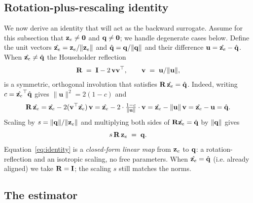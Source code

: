 \subsection{Rotation-plus-rescaling identity}

We now derive an identity that will act as the backward surrogate.
Assume for this subsection that $\mathbf{z}_e \neq \mathbf{0}$ and
$\mathbf{q} \neq \mathbf{0}$; we handle degenerate cases below. Define
the unit vectors $\hat{\mathbf{z}_e} = \mathbf{z}_e/\|\mathbf{z}_e\|$ and
$\hat{\mathbf{q}} = \mathbf{q}/\|\mathbf{q}\|$ and their difference
$\mathbf{u} = \hat{\mathbf{z}_e} - \hat{\mathbf{q}}$. When $\hat{\mathbf{z}_e} \neq
\hat{\mathbf{q}}$ the Householder reflection
\begin{equation}
  \mathbf{R} \;=\; \mathbf{I} - 2\,\mathbf{v}\mathbf{v}^\top,
  \qquad
  \mathbf{v} \;=\; \mathbf{u}/\|\mathbf{u}\|,
  \label{eq:householder}
\end{equation}
is a symmetric, orthogonal involution that satisfies
$\mathbf{R}\,\hat{\mathbf{z}_e} = \hat{\mathbf{q}}$. Indeed, writing
$c = \hat{\mathbf{z}_e}^\top\hat{\mathbf{q}}$ gives $\|\mathbf{u}\|^2 = 2(1 - c)$ and
\begin{equation}
  \mathbf{R}\,\hat{\mathbf{z}_e}
    = \hat{\mathbf{z}_e} - 2(\mathbf{v}^\top\hat{\mathbf{z}_e})\,\mathbf{v}
    = \hat{\mathbf{z}_e} - 2\cdot\tfrac{1-c}{\|\mathbf{u}\|}\cdot\mathbf{v}
    = \hat{\mathbf{z}_e} - \|\mathbf{u}\|\,\mathbf{v}
    = \hat{\mathbf{z}_e} - \mathbf{u}
    = \hat{\mathbf{q}}.
  \label{eq:reflection-check}
\end{equation}
Scaling by $s = \|\mathbf{q}\|/\|\mathbf{z}_e\|$ and multiplying both sides of
$\mathbf{R}\hat{\mathbf{z}_e} = \hat{\mathbf{q}}$ by $\|\mathbf{q}\|$ gives
\begin{equation}
  s\,\mathbf{R}\,\mathbf{z}_e \;=\; \mathbf{q}.
  \label{eq:identity}
\end{equation}
Equation~\eqref{eq:identity} is a \emph{closed-form linear map} from
$\mathbf{z}_e$ to $\mathbf{q}$: a rotation-reflection and an isotropic scaling, no
free parameters. When $\hat{\mathbf{z}_e} = \hat{\mathbf{q}}$ (i.e. already aligned)
we take $\mathbf{R} = \mathbf{I}$; the scaling $s$ still matches the norms.

\subsection{The \ours{} estimator}

